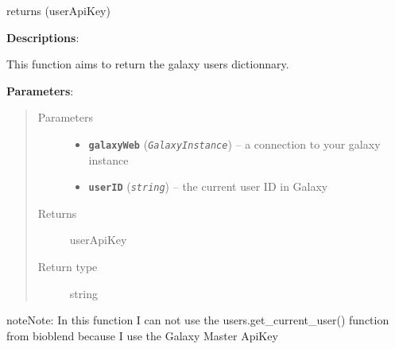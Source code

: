 \documentclass[letterpaper,10pt,english]{sphinxmanual}
\begin{document}
\begin{fulllineitems}
\label{datamanagerpkg:datamanagerpkg.GalaxyCommunication_data_manager.createUserApikey}
returns (userApiKey)

\textbf{Descriptions}:

This function aims to return the galaxy users dictionnary.

\textbf{Parameters}:
\begin{quote}\begin{description}
\item[{Parameters}] \leavevmode\begin{itemize}
\item {} 
\textbf{\texttt{galaxyWeb}} (\emph{\texttt{GalaxyInstance}}) -- a connection to your galaxy instance

\item {} 
\textbf{\texttt{userID}} (\emph{\texttt{string}}) -- the current user ID in  Galaxy

\end{itemize}

\item[{Returns}] \leavevmode
userApiKey

\item[{Return type}] \leavevmode
string

\end{description}\end{quote}

\begin{notice}{note}{Note:}
In this function I can not use the users.get\_current\_user()
function from bioblend because I use the Galaxy Master ApiKey
\end{notice}

\end{fulllineitems}

\end{document}
